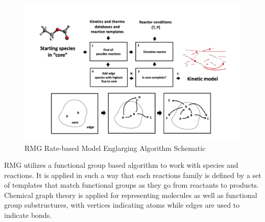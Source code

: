  
 \begin{figure}[htp]
     \centering
     \includegraphics[scale=0.4,keepaspectratio]{images/rmg_core_build.png}
     \caption{RMG Rate-based Model Englarging Algorithm Schematic \cite{Susnow1997Rate-BasedSystems}\cite{Gao2016ReactionMechanisms}}
     \label{fig:rmg_core_build}
 \end{figure}
 
 RMG utilizes a functional group based algorithm to work with species and reactions. It is applied in such a way that each reactions family is defined by a set of templates that match functional groups as they go from reactants to products\cite{Gao2016ReactionMechanisms}. Chemical graph theory is applied for representing molecules as well as functional group substructures, with vertices indicating atoms while edges are used to indicate bonds.
 
